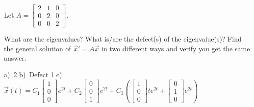 \begin{exercise}
Let
$A = \left[ \begin{smallmatrix} 2 & 1 & 0 \\ 0 & 2 & 0 \\ 0 & 0 & 2 \end{smallmatrix} \right]$.
\begin{tasks}
\task What are the eigenvalues?
\task What is/are the defect(s) of the eigenvalue(s)?
\task Find the general solution of ${\vec{x}}' = A \vec{x}$ in two different
ways and verify you get the same answer.
\end{tasks}
\end{exercise}
\comboSol{%
}
{%
a)~2 \quad b)~Defect 1 \quad c)~$\vec{x}(t) = C_1 \left[\begin{smallmatrix} 1 \\ 0 \\ 0 \end{smallmatrix}\right]e^{2t} + C_2\left[\begin{smallmatrix} 0 \\ 0 \\ 1 \end{smallmatrix}\right]e^{2t} + C_3\left(\left[\begin{smallmatrix} 1 \\ 0 \\ 0 \end{smallmatrix}\right]te^{2t} + \left[\begin{smallmatrix} 0 \\ 1 \\ 0 \end{smallmatrix}\right]e^{2t}\right)$
}


